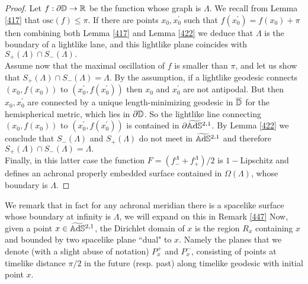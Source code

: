 \begin{proof}
    Let $f:\partial\mathbb{D}\to\mathbb{R}$ be the function whose graph is $\Lambda.$ We recall from Lemma \ref{417} that $\text{osc}(f)\leq\pi$. If there are points $x_0,x_0^{\prime}$ such that $f(x_0^{\prime})=f(x_0)+\pi$ then combining both Lemma \ref{417} and Lemma \ref{422} we deduce that $\Lambda$ is the boundary of a lightlike lane, and this lightlike plane coincides with $S_+(\Lambda)\cap S_-(\Lambda).$\\
    Assume now that the maximal oscillation of $f$ is smaller than $\pi$, and let us show that $S_+(\Lambda)\cap S_-(\Lambda)=\Lambda.$ By the assumption, if a lightlike geodesic connects $(x_0,f(x_0))$ to $(x_0^{\prime} ,f(x_0^{\prime}))$ then $x_0$ and $x_0^{\prime}$ are not antipodal. But then $x_0,x_0^{\prime}$ are connected by a unique length-minimizing geodesic in $\overline{\mathbb{D}}$ for the hemispherical metric, which lies in $\partial\mathbb{D}$. So the lightlike line connecting $(x_0,f(x_0))$ to $(x_0^{\prime},f(x_0^{\prime}))$ is contained in $\partial\widetilde{\mathbb{A}\mathrm{d}\mathbb{S}}{}^{2,1}$. By Lemma \ref{422} we conclude that $S_-(\Lambda)$ and $S_+(\Lambda)$ do not meet in $\widetilde{\mathbb{A}\mathrm{d}\mathbb{S}}{}^{2,1}$ and therefore $S_+(\Lambda)\cap S_-(\Lambda)=\Lambda.$\\
    Finally, in this latter case the function $F=(f^\Lambda_{-}+f^\Lambda_+)/2$ is $1-$Lipschitz and defines an achronal properly embedded surface contained in $\Omega(\Lambda)$, whose boundary is $\Lambda$. 
\end{proof}

We remark that in fact for any achronal meridian there is a spacelike surface whose boundary at infinity is $\Lambda$, we will expand on this in Remark \ref{447}
Now, given a point $x \in \widetilde{\mathbb{A}\mathrm{d}\mathbb{S}}{}^{2,1}$, the Dirichlet domain of $x$ is the region $R_x$ containing $x$ and bounded by two spacelike plane “dual" to $x$. Namely the planes that we denote (with a slight abuse of notation) $P_x^+$ and $P_x^-$, consisting of points at timelike distance $\pi/2$ in the future (resp. past) along timelike geodesic with initial point $x$.

